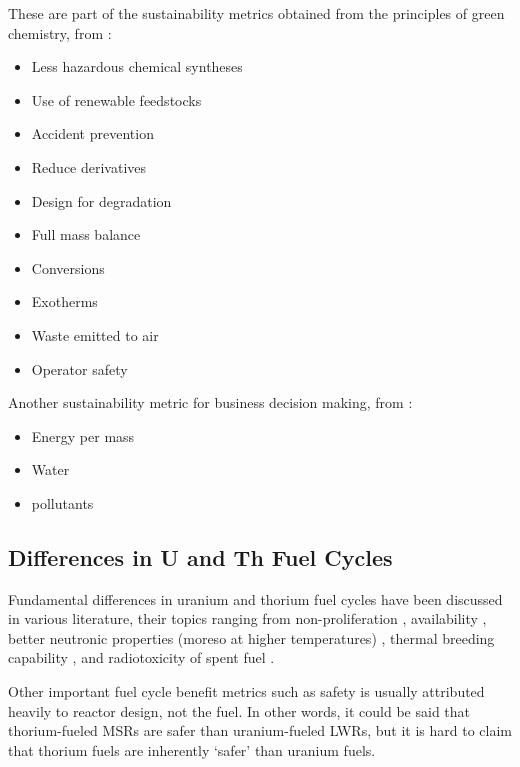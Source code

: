 \documentclass{article}
\begin{document}
These are part of the sustainability metrics obtained from the principles
of green chemistry, from \cite{gonzalez_methodology_2003}:
\begin{itemize}
    \item Less hazardous chemical syntheses
    \item Use of renewable feedstocks
    \item Accident prevention
    \item Reduce derivatives
    \item Design for degradation
    \item Full mass balance
    \item Conversions
    \item Exotherms
    \item Waste emitted to air
    \item Operator safety
\end{itemize}

\noindent Another sustainability metric for business decision making, from \cite{schwarz_use_2002}:
\begin{itemize}
    \item Energy per mass
    \item Water
    \item pollutants
\end{itemize}


\subsection{Differences in U and Th Fuel Cycles}
Fundamental differences in uranium and thorium fuel
cycles have been discussed in various literature,
their topics ranging from 
non-proliferation
\cite{iaea_thorium_2005} 
\cite{moir_recommendations_2008} 
\cite{kang_u-232_2001} %
,
availability
\cite{herring_uranium_2013}
,
better neutronic properties (moreso at higher temperatures)
\cite{lung_perspectives_1998}
,
thermal breeding capability
\cite{robertson_conceptual_1971}
,
and 
radiotoxicity of spent fuel
\cite{croff_comparative_2016}
.


Other important fuel cycle benefit metrics
such as safety is usually attributed heavily
to reactor design, not the fuel. In other words,
it could be said that thorium-fueled \glspl{MSR} are safer
than uranium-fueled \glspl{LWR}, but it is hard to claim
that thorium fuels are inherently `safer' than uranium fuels.
\end{document}
